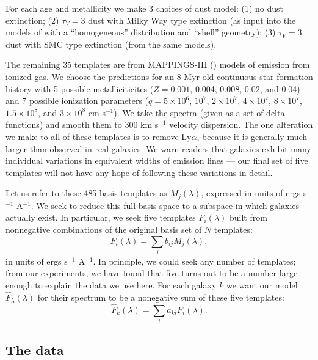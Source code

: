 \documentclass[10pt,preprint]{aastex}
\renewcommand{\AA}{A}
\begin{document}
For each age and metallicity we make 3 choices of dust model: (1) no
dust extinction; (2) $\tau_V = 3$ dust with Milky Way type extinction
(as input into the models of \citealt{witt00a} with a ``homogeneous''
distribution and ``shell'' geometry); (3) $\tau_V = 3$ dust with SMC
type extinction (from the same models).

The remaining 35 templates are from MAPPINGS-III (\citealt{kewley01a})
models of emission from ionized gas. We choose the predictions for an
8 Myr old continuous star-formation history with 5 possible
metalliciticites ($Z=0.001$, 0.004, 0.008, 0.02, and 0.04) and 7
possible ionization parameters ($q= 5\times 10^6$, $10^7$, $2\times
10^7$, $4\times 10^7$, $8 \times 10^7$, $1.5\times 10^8$, and $3\times
10^8$ cm s$^{-1}$). We take the spectra (given as a set of delta
functions) and smooth them to $300$ km s$^{-1}$ velocity
dispersion. The one alteration we make to all of these templates is to
remove Ly$\alpha$, because it is generally much larger than observed
in real galaxies. We warn readers that galaxies exhibit many
individual variations in equivalent widths of emission lines --- our
final set of five templates will not have any hope of following these
variations in detail.

Let us refer to these 485 basis templates as $M_{j}(\lambda)$,
expressed in units of ergs s$^{-1}$ \AA$^{-1}$.  We seek to reduce
this full basis space to a subspace in which galaxies actually
exist. In particular, we seek five templates $F_{i}(\lambda)$ built
from nonnegative combinations of the original basis set of $N$
templates:
\begin{equation}
F_{i}(\lambda) = \sum_j b_{ij} M_{j}(\lambda),
\end{equation}
in units of ergs s$^{-1}$ \AA$^{-1}$. In principle, we could seek any
number of templates; from our experiments, we have found that five
turns out to be a number large enough to explain the data we use
here. For each galaxy $k$ we want our model
${\hat{F}_\lambda}(\lambda)$ for their spectrum to be a nonegative sum
of these five templates:
\begin{equation}
{\hat{F}}_{k}(\lambda) = \sum_i a_{ki} F_{i}(\lambda).
\end{equation}

\subsection{The data}
\label{data}
\end{document}
